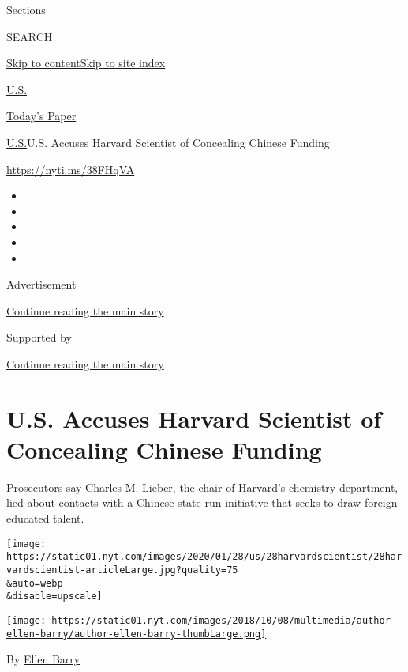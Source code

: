 Sections

SEARCH

\protect\hyperlink{site-content}{Skip to
content}\protect\hyperlink{site-index}{Skip to site index}

\href{https://www.nytimes.com/section/us}{U.S.}

\href{https://myaccount.nytimes.com/auth/login?response_type=cookie\&client_id=vi}{}

\href{https://www.nytimes.com/section/todayspaper}{Today's Paper}

\href{/section/us}{U.S.}\textbar{}U.S. Accuses Harvard Scientist of
Concealing Chinese Funding

\url{https://nyti.ms/38FHqVA}

\begin{itemize}
\item
\item
\item
\item
\item
\end{itemize}

Advertisement

\protect\hyperlink{after-top}{Continue reading the main story}

Supported by

\protect\hyperlink{after-sponsor}{Continue reading the main story}

\hypertarget{us-accuses-harvard-scientist-of-concealing-chinese-funding}{%
\section{U.S. Accuses Harvard Scientist of Concealing Chinese
Funding}\label{us-accuses-harvard-scientist-of-concealing-chinese-funding}}

Prosecutors say Charles M. Lieber, the chair of Harvard's chemistry
department, lied about contacts with a Chinese state-run initiative that
seeks to draw foreign-educated talent.

\texttt{[image: https://static01.nyt.com/images/2020/01/28/us/28harvardscientist/28harvardscientist-articleLarge.jpg?quality=75\\\&auto=webp\\\&disable=upscale]}

\href{https://www.nytimes.com/by/ellen-barry}{\texttt{[image: https://static01.nyt.com/images/2018/10/08/multimedia/author-ellen-barry/author-ellen-barry-thumbLarge.png]}}

By \href{https://www.nytimes.com/by/ellen-barry}{Ellen Barry}

